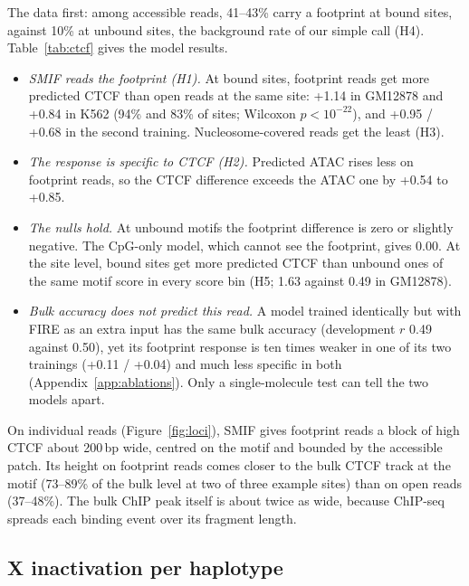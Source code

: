 \documentclass[acmtog,nonacm]{acmart}   %
\begin{document}
The data first: among accessible reads, 41--43\% carry a footprint at bound sites, against 10\% at unbound sites,
the background rate of our simple call (H4). Table~\ref{tab:ctcf} gives the model results.
\begin{itemize}
  \item \emph{SMIF reads the footprint (H1).} At bound sites, footprint reads get more predicted CTCF than open reads
    at the same site: +1.14 in GM12878 and +0.84 in K562 (94\% and 83\% of sites; Wilcoxon $p<10^{-22}$), and
    +0.95 / +0.68 in the second training. Nucleosome-covered reads get the least (H3).
  \item \emph{The response is specific to CTCF (H2).} Predicted ATAC rises less on footprint reads, so the CTCF
    difference exceeds the ATAC one by +0.54 to +0.85.
  \item \emph{The nulls hold.} At unbound motifs the footprint difference is zero or slightly negative. The CpG-only
    model, which cannot see the footprint, gives 0.00. At the site level, bound sites get more predicted CTCF than
    unbound ones of the same motif score in every score bin (H5; 1.63 against 0.49 in GM12878).
  \item \emph{Bulk accuracy does not predict this read.} A model trained identically but with FIRE as an extra input
    has the same bulk accuracy (development $r$ 0.49 against 0.50), yet its footprint response is ten times weaker
    in one of its two trainings (+0.11 / +0.04) and much less specific in both (Appendix~\ref{app:ablations}). Only a
    single-molecule test can tell the two models apart.
\end{itemize}

On individual reads (Figure~\ref{fig:loci}), SMIF gives footprint reads a block of high CTCF about 200\,bp wide,
centred on the motif and bounded by the accessible patch. Its height on footprint reads comes closer to the bulk
CTCF track at the motif (73--89\% of the bulk level at two of three example sites) than on open reads (37--48\%).
The bulk ChIP peak itself is about twice as wide, because ChIP-seq spreads each binding event over its fragment
length.

\subsection{X inactivation per haplotype}
\label{sec:res-xi}
\end{document}
